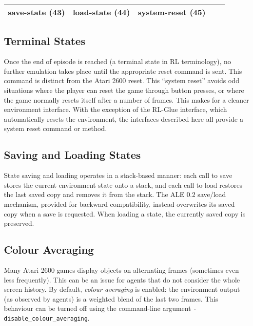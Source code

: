 \documentclass[12pt]{article}
\begin{document}
\begin{center}
\begin{tabular}{|r|r|r|r|r|}
\hline
save-state (43) & load-state (44) & system-reset (45) \\
\hline
\end{tabular}
\end{center}

\subsection{Terminal States}

Once the end of episode is reached (a terminal state in RL terminology), no further emulation 
takes place until the appropriate reset command is sent. This command is distinct from the Atari 
2600 reset. This ``system reset'' avoids odd situations where the player can reset the game
through button presses, or where the game normally resets itself after a number of frames. This 
makes for a cleaner environment interface. With the exception of the RL-Glue interface, which 
automatically resets the environment, the interfaces described here all provide a system reset
command or method.

\subsection{Saving and Loading States}

State saving and loading operates in a stack-based manner: each call to save stores the current
environment state onto a stack, and each call to load restores the last saved copy and removes
it from the stack. The ALE 0.2 save/load mechanism, provided for backward compatibility, instead
overwrites its saved copy when a save is requested. When loading a state, the currently saved copy
is preserved.

\subsection{Colour Averaging}

Many Atari 2600 games display objects on alternating frames (sometimes even less frequently).
This can be an issue for agents that do not consider the whole screen history. By default, 
\emph{colour averaging} is enabled: the environment output (as observed by agents) is a weighted
blend of the last two frames. This behaviour can be turned off using the command-line argument 
\verb+-disable_colour_averaging+. 
\end{document}
